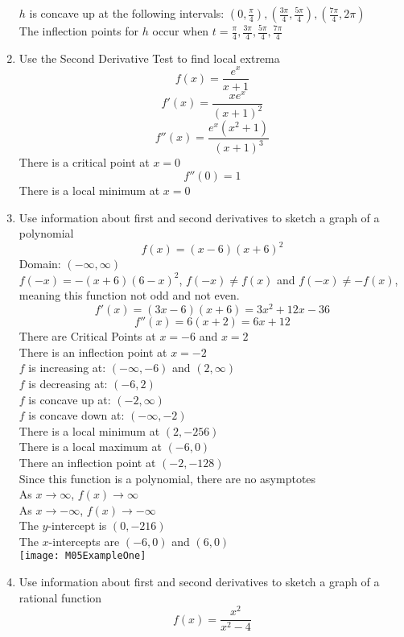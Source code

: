 \documentclass{article}
\begin{document}
\begin{enumerate}
    $h$ is concave up at the following intervals: $\left(0, \frac{\pi}{4}\right), \left(\frac{3\pi}{4}, \frac{5\pi}{4}\right), \left(\frac{7\pi}{4}, 2\pi\right)$ \\
    The inflection points for $h$ occur when $t = \frac{\pi}{4}, \frac{3\pi}{4}, \frac{5\pi}{4}, \frac{7\pi}{4}$
    \item Use the Second Derivative Test to find local extrema
    $$f(x) = \frac{e^x}{x + 1}$$
    $$f'(x) = \frac{xe^x}{\left(x + 1\right)^2}$$
    $$f''(x) = \frac{e^x\left(x^2+1\right)}{\left(x+1\right)^3}$$
    There is a critical point at $x = 0$
    $$f''(0) = 1$$
    There is a local minimum at $x = 0$
    \item Use information about first and second derivatives to sketch a graph of a polynomial
    $$f(x) = (x - 6)(x + 6)^2$$
    Domain: $(-\infty, \infty)$ \\
    $f(-x) = -(x + 6)(6 - x)^2$, $f(-x) \neq f(x)$ and $f(-x) \neq -f(x)$, meaning this function not odd and not even. \\
    $$f'(x) = (3x - 6)(x + 6) = 3x^2+12x-36$$
    $$f''(x) = 6(x + 2) = 6x+12$$
    There are Critical Points at $x = -6$ and $x = 2$ \\
    There is an inflection point at $x = -2$ \\
    $f$ is increasing at: $(-\infty, -6)$ and $(2, \infty)$ \\
    $f$ is decreasing at: $(-6, 2)$ \\
    $f$ is concave up at: $(-2, \infty)$ \\
    $f$ is concave down at: $(-\infty, -2)$ \\
    There is a local minimum at $(2, -256)$ \\
    There is a local maximum at $(-6, 0)$ \\
    There an inflection point at $(-2, -128)$ \\
    Since this function is a polynomial, there are no asymptotes \\
    As $x \to \infty$, $f(x) \to \infty$ \\
    As $x \to -\infty$, $f(x) \to -\infty$ \\
    The $y$-intercept is $(0, -216)$ \\
    The $x$-intercepts are $(-6, 0)$ and $(6, 0)$ \\
    \texttt{[image: M05ExampleOne]}
    \item Use information about first and second derivatives to sketch a graph of a rational function
    $$f(x) = \frac{x^2}{x^2 - 4}$$

\end{enumerate}
\end{document}
